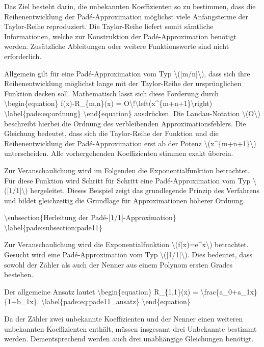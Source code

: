 Das Ziel besteht darin, die unbekannten Koeffizienten so zu bestimmen,
dass die Reihenentwicklung der Padé-Approximation möglichst viele
Anfangsterme der Taylor-Reihe reproduziert. Die Taylor-Reihe liefert
somit sämtliche Informationen, welche zur Konstruktion der
Padé-Approximation benötigt werden. Zusätzliche Ableitungen oder weitere
Funktionswerte sind nicht erforderlich.

Allgemein gilt für eine Padé-Approximation vom Typ
\textbackslash({[}m/n{]}\textbackslash), dass sich ihre
Reihenentwicklung möglichst lange mit der Taylor-Reihe der
ursprünglichen Funktion decken soll. Mathematisch lässt sich diese
Forderung durch \textbackslash begin\{equation\} f(x)-R\_\{m,n\}(x) =
O\textbackslash!\textbackslash left(x\^{}\{m+n+1\}\textbackslash right)
\textbackslash label\{pade:eq:ordnung\} \textbackslash end\{equation\}
ausdrücken. Die Landau-Notation \textbackslash(O\textbackslash)
beschreibt hierbei die Ordnung des verbleibenden Approximationsfehlers.
Die Gleichung bedeutet, dass sich die Taylor-Reihe der Funktion und die
Reihenentwicklung der Padé-Approximation erst ab der Potenz
\textbackslash(x\^{}\{m+n+1\}\textbackslash) unterscheiden. Alle
vorhergehenden Koeffizienten stimmen exakt überein.

Zur Veranschaulichung wird im Folgenden die Exponentialfunktion
betrachtet. Für diese Funktion wird Schritt für Schritt eine
Padé-Approximation vom Typ \textbackslash({[}1/1{]}\textbackslash)
hergeleitet. Dieses Beispiel zeigt das grundlegende Prinzip des
Verfahrens und bildet gleichzeitig die Grundlage für Approximationen
höherer Ordnung.

\textbackslash subsection\{Herleitung der Padé-{[}1/1{]}-Approximation\}
\textbackslash label\{pade:subsection:pade11\}

Zur Veranschaulichung wird die Exponentialfunktion
\textbackslash(f(x)=e\^{}x\textbackslash) betrachtet. Gesucht wird eine
Padé-Approximation vom Typ \textbackslash({[}1/1{]}\textbackslash). Dies
bedeutet, dass sowohl der Zähler als auch der Nenner aus einem Polynom
ersten Grades bestehen.

Der allgemeine Ansatz lautet \textbackslash begin\{equation\}
R\_\{1,1\}(x) = \textbackslash frac\{a\_0+a\_1x\}\{1+b\_1x\}.
\textbackslash label\{pade:eq:pade11\_ansatz\}
\textbackslash end\{equation\}

Da der Zähler zwei unbekannte Koeffizienten und der Nenner einen
weiteren unbekannten Koeffizienten enthält, müssen insgesamt drei
Unbekannte bestimmt werden. Dementsprechend werden auch drei unabhängige
Gleichungen benötigt.

